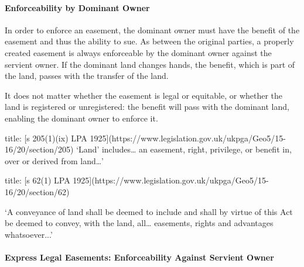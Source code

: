 \documentclass[
]{article}
\newenvironment{Shaded}{}{}
\newcommand{\NormalTok}[1]{#1}
\begin{document}
\hypertarget{enforceability-by-dominant-owner}{%
\paragraph{Enforceability by Dominant
Owner}\label{enforceability-by-dominant-owner}}

In order to enforce an easement, the dominant owner must have the
benefit of the easement and thus the ability to sue. As between the
original parties, a properly created easement is always enforceable by
the dominant owner against the servient owner. If the dominant land
changes hands, the benefit, which is part of the land, passes with the
transfer of the land.

It does not matter whether the easement is legal or equitable, or
whether the land is registered or unregistered: the benefit will pass
with the dominant land, enabling the dominant owner to enforce it.

\begin{Shaded}
\begin{Highlighting}[]
\NormalTok{title: [s 205(1)(ix) LPA 1925](https://www.legislation.gov.uk/ukpga/Geo5/15{-}16/20/section/205)}
\NormalTok{‘Land’ includes… an easement, right, privilege, or benefit in, over or derived from land…’}
\end{Highlighting}
\end{Shaded}

\begin{Shaded}
\begin{Highlighting}[]
\NormalTok{title: [s 62(1) LPA 1925](https://www.legislation.gov.uk/ukpga/Geo5/15{-}16/20/section/62)}

\NormalTok{‘A conveyance of land shall be deemed to include and shall by virtue of this Act be deemed to convey, with the land, all… easements, rights and advantages whatsoever...’}
\end{Highlighting}
\end{Shaded}

\hypertarget{express-legal-easements-enforceability-against-servient-owner}{%
\paragraph{Express Legal Easements: Enforceability Against Servient
Owner}\label{express-legal-easements-enforceability-against-servient-owner}}
\end{document}
